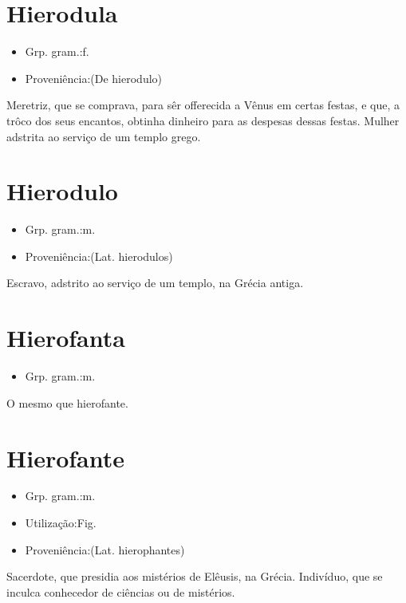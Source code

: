 \documentclass{article}
\begin{document}
\section{Hierodula}
\begin{itemize}
\item {Grp. gram.:f.}
\end{itemize}
\begin{itemize}
\item {Proveniência:(De \textunderscore hierodulo\textunderscore )}
\end{itemize}
Meretriz, que se comprava, para sêr offerecida a Vênus em certas festas, e que, a trôco dos seus encantos, obtinha dinheiro para as despesas dessas festas.
Mulher adstrita ao serviço de um templo grego.
\section{Hierodulo}
\begin{itemize}
\item {Grp. gram.:m.}
\end{itemize}
\begin{itemize}
\item {Proveniência:(Lat. \textunderscore hierodulos\textunderscore )}
\end{itemize}
Escravo, adstrito ao serviço de um templo, na Grécia antiga.
\section{Hierofanta}
\begin{itemize}
\item {Grp. gram.:m.}
\end{itemize}
O mesmo que \textunderscore hierofante\textunderscore .
\section{Hierofante}
\begin{itemize}
\item {Grp. gram.:m.}
\end{itemize}
\begin{itemize}
\item {Utilização:Fig.}
\end{itemize}
\begin{itemize}
\item {Proveniência:(Lat. \textunderscore hierophantes\textunderscore )}
\end{itemize}
Sacerdote, que presidia aos mistérios de Elêusis, na Grécia.
Indivíduo, que se inculca conhecedor de ciências ou de mistérios.
\end{document}

